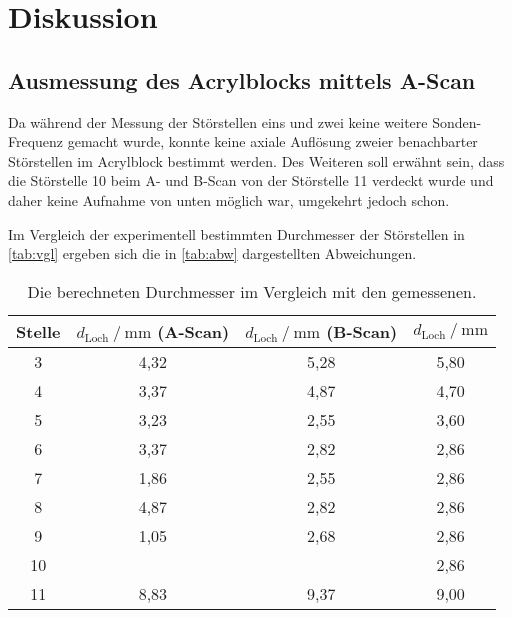 \section{Diskussion}
\label{sec:Diskussion}

\subsection{Ausmessung des Acrylblocks mittels A-Scan}

Da während der Messung der Störstellen eins und zwei keine weitere Sonden-Frequenz gemacht wurde, 
konnte keine axiale Auflösung zweier benachbarter Störstellen im Acrylblock bestimmt werden.
Des Weiteren soll erwähnt sein, dass die Störstelle 10 beim A- und B-Scan von der Störstelle 11 verdeckt wurde und daher keine Aufnahme von unten möglich war, 
umgekehrt jedoch schon.

Im Vergleich der experimentell bestimmten Durchmesser der Störstellen in \autoref{tab:vgl} ergeben sich die in \autoref{tab:abw} dargestellten Abweichungen.
\begin{table}[H]
    \centering
    \caption{Die berechneten Durchmesser im Vergleich mit den gemessenen.}
    \label{tab:vgl}
    \begin{tabular}{c c c c}
        \toprule
        Stelle &
        $d_\text{Loch} \mathbin{/} \unit{\milli\meter}$ (A-Scan) &
        $d_\text{Loch} \mathbin{/} \unit{\milli\meter}$ (B-Scan) & 
        $d_\text{Loch} \mathbin{/} \unit{\milli\meter}$ \\
        \midrule
                3 &             4,32 &             5,28 &           5,80 \\
                4 &             3,37 &             4,87 &           4,70 \\
                5 &             3,23 &             2,55 &           3,60 \\
                6 &             3,37 &             2,82 &           2,86 \\
                7 &             1,86 &             2,55 &           2,86 \\
                8 &             4,87 &             2,82 &           2,86 \\
                9 &             1,05 &             2,68 &           2,86 \\
                10 &                  &                  &           2,86 \\
                11 &             8,83 &             9,37 &           9,00 \\
        \bottomrule
    \end{tabular}
\end{table}

